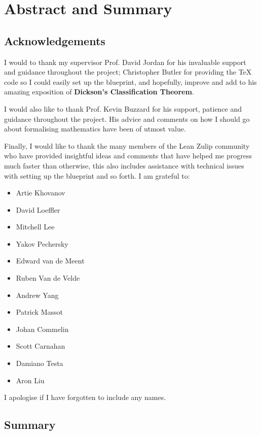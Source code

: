 \chapter{Abstract and Summary}\label{Ch1_AbstractAndAcknowledgements}

\section{Acknowledgements}

I would to thank my supervisor Prof. David Jordan for his invaluable support and guidance throughout the project;
Christopher Butler for providing the TeX code so I could easily set up the blueprint, and hopefully, improve and add to his amazing exposition of
\textbf{Dickson's Classification Theorem}.

I would also like to thank Prof. Kevin Buzzard for his support, patience and guidance throughout the project. His advice and comments on how I should go about formalising mathematics have been of utmost value. 

Finally, I would like to thank the many members of the Lean Zulip community who have provided insightful ideas and comments that have helped me progress much faster than otherwise, 
this also includes assistance with technical issues with setting up the blueprint and so forth. I am grateful to:

\begin{itemize}
    \item Artie Khovanov
    \item David Loeffler
    \item Mitchell Lee
    \item Yakov Pechersky
    \item Edward van de Meent
    \item Ruben Van de Velde
    \item Andrew Yang
    \item Patrick Massot
    \item Johan Commelin
    \item Scott Carnahan
    \item Damiano Testa
    \item Aron Liu
\end{itemize}

I apologise if I have forgotten to include any names.

\section{Summary}

